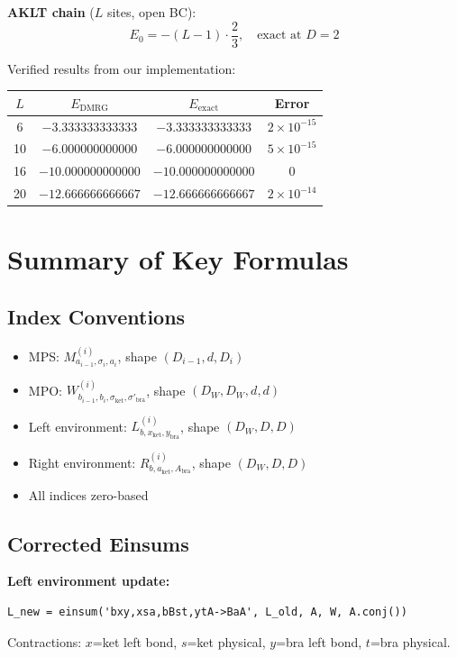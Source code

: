 \documentclass[aps,prb,onecolumn,scriptaddress]{revtex4-2}
\begin{document}
\textbf{AKLT chain} ($L$ sites, open BC):
\begin{equation}
E_0 = -(L-1) \cdot \frac{2}{3}, \quad \text{exact at } D=2
\end{equation}

Verified results from our implementation:
\begin{center}
\begin{tabular}{@{}cccc@{}}
	\toprule
	$L$ & $E_{\text{DMRG}}$ & $E_{\text{exact}}$ & Error \\
	\midrule
	6 & $-3.333333333333$ & $-3.333333333333$ & $2 \times 10^{-15}$ \\
	10 & $-6.000000000000$ & $-6.000000000000$ & $5 \times 10^{-15}$ \\
	16 & $-10.000000000000$ & $-10.000000000000$ & $0$ \\
	20 & $-12.666666666667$ & $-12.666666666667$ & $2 \times 10^{-14}$ \\
	\bottomrule
\end{tabular}
\end{center}

\section{Summary of Key Formulas}

\subsection{Index Conventions}
\begin{itemize}
\item MPS: $M^{(i)}_{a_{i-1}, \sigma_i, a_i}$, shape $(D_{i-1}, d, D_i)$
\item MPO: $W^{(i)}_{b_{i-1}, b_i, \sigma_{\text{ket}}, \sigma'_{\text{bra}}}$, shape $(D_W, D_W, d, d)$
\item Left environment: $L^{(i)}_{b, x_{\text{ket}}, y_{\text{bra}}}$, shape $(D_W, D, D)$
\item Right environment: $R^{(i)}_{b, a_{\text{ket}}, A_{\text{bra}}}$, shape $(D_W, D, D)$
\item All indices zero-based
\end{itemize}

\subsection{Corrected Einsums}

\textbf{Left environment update:}
\begin{verbatim}
L_new = einsum('bxy,xsa,bBst,ytA->BaA', L_old, A, W, A.conj())
\end{verbatim}
Contractions: $x$=ket left bond, $s$=ket physical, $y$=bra left bond, $t$=bra physical.
\end{document}
